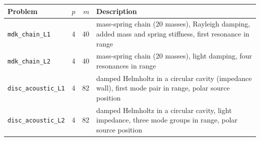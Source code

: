 \begin{tabular}{lrrp{7.2cm}}
\toprule
Problem & $p$ & $m$ & Description \\
\midrule
\texttt{mdk\_chain\_L1} & 4 & 40 & mass-spring chain (20 masses), Rayleigh damping, added mass and spring stiffness, first resonance in range \\
\texttt{mdk\_chain\_L2} & 4 & 40 & mass-spring chain (20 masses), light damping, four resonances in range \\
\texttt{disc\_acoustic\_L1} & 4 & 82 & damped Helmholtz in a circular cavity (impedance wall), first mode pair in range, polar source position \\
\texttt{disc\_acoustic\_L2} & 4 & 82 & damped Helmholtz in a circular cavity, light impedance, three mode groups in range, polar source position \\
\bottomrule
\end{tabular}
